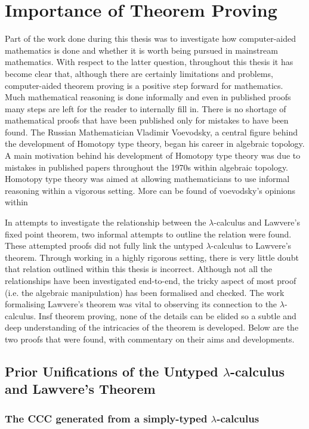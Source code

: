 \section{Importance of Theorem Proving}
Part of the  work done during this thesis was to investigate how computer-aided
mathematics is done and whether it is worth being pursued in mainstream
mathematics. With respect to the latter question, throughout this thesis it has
become clear that, although there are certainly limitations and problems,
computer-aided theorem proving is a positive step forward for mathematics. Much
mathematical reasoning is done informally and even in published proofs many
steps are left for the reader to internally fill in. There is no shortage of
mathematical proofs that have been published only for mistakes to have been
found. The Russian Mathematician Vladimir Voevodsky, a central figure behind the
development of Homotopy type theory, began his career in algebraic topology. A
main motivation behind his development of Homotopy type theory was due to
mistakes in published papers throughout the 1970s within algebraic topology.
Homotopy type theory was aimed at allowing mathematicians to use informal
reasoning within a vigorous setting. More can be found of voevodsky's opinions
within 

In attempts to investigate the relationship between the $\lambda$-calculus and
Lawvere's fixed point theorem, two informal attempts to outline the relation
were found. These attempted proofs did not fully link the untyped
$\lambda$-calculus to Lawvere's theorem. Through working in a highly rigorous
setting, there is very little doubt that relation outlined within this thesis is
incorrect. Although not all the relationships have been investigated end-to-end,
the tricky aspect of most proof (i.e. the algebraic manipulation) has been
formalised and checked. The work formalising Lawvere's theorem was vital to
observing its connection to the $\lambda$-calculus. Insf
theorem proving, none of the details can be elided so a subtle and deep
understanding of the intricacies of the theorem is developed. Below are the two
proofs that were found, with commentary on their aims and developments.

\subsection{Prior Unifications of the Untyped $\lambda$-calculus and
Lawvere's Theorem}
\label{quote:prior}
\subsubsection{The CCC generated from a simply-typed $\lambda$-calculus}


